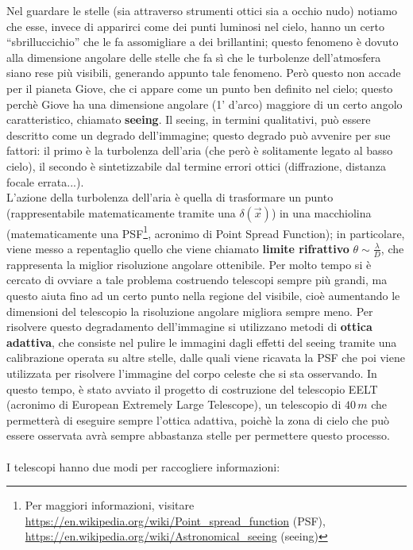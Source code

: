 Nel guardare le stelle (sia attraverso strumenti ottici sia a occhio nudo) notiamo che esse, invece di apparirci come dei punti luminosi nel cielo, hanno un certo ``sbrilluccichio'' che le fa assomigliare a dei brillantini; questo fenomeno è dovuto alla dimensione angolare delle stelle che fa sì che le turbolenze dell'atmosfera siano rese più visibili, generando appunto tale fenomeno. Però questo non accade per il pianeta Giove, che ci appare come un punto ben definito nel cielo; questo perchè Giove ha una dimensione angolare (1' d'arco) maggiore di un certo angolo caratteristico, chiamato \textbf{seeing}. Il seeing, in termini qualitativi, può essere descritto come un degrado dell'immagine; questo degrado può avvenire per sue fattori: il primo è la turbolenza dell'aria (che però è solitamente legato al basso cielo), il secondo è sintetizzabile dal termine errori ottici (diffrazione, distanza focale errata...).\\
L'azione della turbolenza dell'aria è quella di trasformare un punto (rappresentabile matematicamente tramite una $\delta(\vec{x})$) in una macchiolina (matematicamente una PSF\footnote{Per maggiori informazioni, visitare \url{https://en.wikipedia.org/wiki/Point_spread_function} (PSF), \url{https://en.wikipedia.org/wiki/Astronomical_seeing} (seeing)}, acronimo di Point Spread Function); in particolare, viene messo a repentaglio quello che viene chiamato \textbf{limite rifrattivo} $\theta \sim \frac{\lambda}{D}$, che rappresenta la miglior risoluzione angolare ottenibile. Per molto tempo si è cercato di ovviare a tale problema costruendo telescopi sempre più grandi, ma questo aiuta fino ad un certo punto nella regione del visibile, cioè aumentando le dimensioni del telescopio la risoluzione angolare migliora sempre meno. Per risolvere questo degradamento dell'immagine si utilizzano metodi di \textbf{ottica adattiva}, che consiste nel pulire le immagini dagli effetti del seeing tramite una calibrazione operata su altre stelle, dalle quali viene ricavata la PSF che poi viene utilizzata per risolvere l'immagine del corpo celeste che si sta osservando. In questo tempo, è stato avviato il progetto di costruzione del telescopio EELT (acronimo di European Extremely Large Telescope), un telescopio di $40 \, m$ che permetterà di eseguire sempre l'ottica adattiva, poichè la zona di cielo che può essere osservata avrà sempre abbastanza stelle per permettere questo processo.
\\
\\
I telescopi hanno due modi per raccogliere informazioni:
